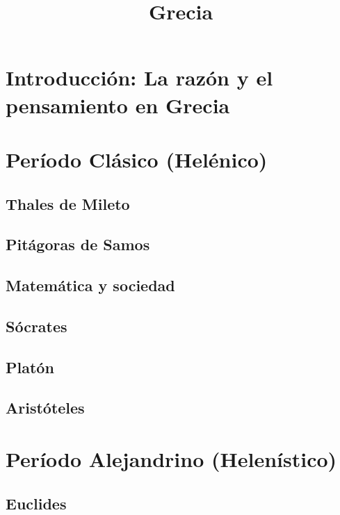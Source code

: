 \title{\vspace{-2cm}Grecia}
\date{}
\maketitle

\section{Introducción: La razón y el pensamiento en Grecia}


\section{Período Clásico (Helénico)}


\subsection{Thales de Mileto}


\subsection{Pitágoras de Samos}


\subsection{Matemática y sociedad}


\subsection{Sócrates}


\subsection{Platón}


\subsection{Aristóteles}


\section{Período Alejandrino (Helenístico)}


\subsection{Euclides}


